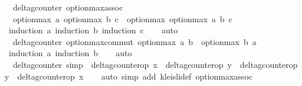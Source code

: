 \begin{isabellebody}
\isanewline
{}\isamarkupfalse%
\ {\isacharparenleft}\ delta{\isacharunderscore}gcounter{\isacharparenright}\ option{\isacharunderscore}max{\isacharunderscore}assoc{\isacharcolon}\isanewline
\ \ {\isachardoublequoteopen}option{\isacharunderscore}max\ a\ {\isacharparenleft}option{\isacharunderscore}max\ b\ c{\isacharparenright}\ {\isacharequal}\ option{\isacharunderscore}max\ {\isacharparenleft}option{\isacharunderscore}max\ a\ b{\isacharparenright}\ c{\isachardoublequoteclose}\isanewline
%
\isadelimproof
\ \ %
\endisadelimproof
%
\isatagproof
{}\isamarkupfalse%
\ {\isacharparenleft}induction\ a{\isacharsemicolon}\ induction\ b{\isacharsemicolon}\ induction\ c{\isacharparenright}\isanewline
\ \ \isamarkupfalse%
\ {\isacharparenleft}auto{\isacharparenright}\isanewline
\ \ \isamarkupfalse%
%
\endisatagproof
{\isafoldproof}%
%
\isadelimproof
\isanewline
%
\endisadelimproof
\isanewline
{}\isamarkupfalse%
\ {\isacharparenleft}\ delta{\isacharunderscore}gcounter{\isacharparenright}\ option{\isacharunderscore}max{\isacharunderscore}commut{\isacharcolon}\ {\isachardoublequoteopen}option{\isacharunderscore}max\ a\ b\ {\isacharequal}\ option{\isacharunderscore}max\ b\ a{\isachardoublequoteclose}\isanewline
%
\isadelimproof
\ \ %
\endisadelimproof
%
\isatagproof
{}\isamarkupfalse%
\ {\isacharparenleft}induction\ a{\isacharsemicolon}\ induction\ b{\isacharparenright}\isanewline
\ \ \isamarkupfalse%
\ {\isacharparenleft}auto{\isacharparenright}\isanewline
\ \ \isamarkupfalse%
%
\endisatagproof
{\isafoldproof}%
%
\isadelimproof
\isanewline
%
\endisadelimproof
\isanewline
{}\isamarkupfalse%
\ {\isacharparenleft}\ delta{\isacharunderscore}gcounter{\isacharparenright}\ {\isacharbrackleft}simp{\isacharbrackright}\ {\isacharcolon}\ {\isachardoublequoteopen}delta{\isacharunderscore}gcounter{\isacharunderscore}op\ x\ {\isasymrhd}\ delta{\isacharunderscore}gcounter{\isacharunderscore}op\ y\ {\isacharequal}\ delta{\isacharunderscore}gcounter{\isacharunderscore}op\ y\ {\isasymrhd}\ delta{\isacharunderscore}gcounter{\isacharunderscore}op\ x{\isachardoublequoteclose}\isanewline
%
\isadelimproof
\ \ %
\endisadelimproof
%
\isatagproof
{}\isamarkupfalse%
\ {\isacharparenleft}auto\ simp\ add{\isacharcolon}\ kleisli{\isacharunderscore}def\ option{\isacharunderscore}max{\isacharunderscore}assoc{\isacharparenright}\isanewline

\end{isabellebody}

